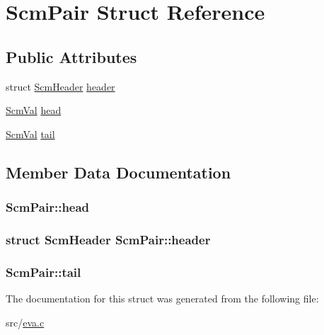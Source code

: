 \hypertarget{struct_scm_pair}{\section{Scm\-Pair Struct Reference}
\label{struct_scm_pair}
}
\subsection*{Public Attributes}
\begin{DoxyCompactItemize}
\item 
struct \hyperlink{struct_scm_header}{Scm\-Header} \hyperlink{struct_scm_pair_a874fa5f3a3cd5faa2ba66ade7291bc6c}{header}
\item 
\hyperlink{eva_8h_a9e754b130d398cb7a4000c8c7a046427}{Scm\-Val} \hyperlink{struct_scm_pair_afbe70a7dd75e5af09ce95b49fa844a35}{head}
\item 
\hyperlink{eva_8h_a9e754b130d398cb7a4000c8c7a046427}{Scm\-Val} \hyperlink{struct_scm_pair_a8a40bc2c197ac0f26ff82901120df397}{tail}
\end{DoxyCompactItemize}


\subsection{Member Data Documentation}
\hypertarget{struct_scm_pair_afbe70a7dd75e5af09ce95b49fa844a35}{
\subsubsection[{head}]{ Scm\-Pair\-::head}}\label{struct_scm_pair_afbe70a7dd75e5af09ce95b49fa844a35}
\hypertarget{struct_scm_pair_a874fa5f3a3cd5faa2ba66ade7291bc6c}{
\subsubsection[{header}]{\setlength{\rightskip}{0pt plus 5cm}struct {\bf Scm\-Header} Scm\-Pair\-::header}}\label{struct_scm_pair_a874fa5f3a3cd5faa2ba66ade7291bc6c}
\hypertarget{struct_scm_pair_a8a40bc2c197ac0f26ff82901120df397}{
\subsubsection[{tail}]{ Scm\-Pair\-::tail}}\label{struct_scm_pair_a8a40bc2c197ac0f26ff82901120df397}


The documentation for this struct was generated from the following file\-:\begin{DoxyCompactItemize}
\item 
src/\hyperlink{eva_8c}{eva.\-c}\end{DoxyCompactItemize}
